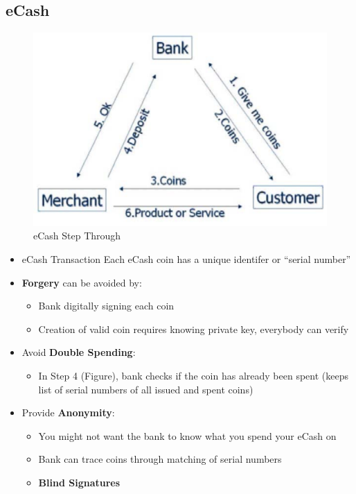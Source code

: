 \subsection{eCash}
\begin{figure}[H]
	\includegraphics[width=\linewidth]{eCash}
	\centering
	\caption{eCash Step Through}
\end{figure}
\begin{itemize}
	\item eCash Transaction
	\subitem Each eCash coin has a unique identifer or ``serial number''
	\item \textbf{Forgery} can be avoided by:
	\begin{itemize}
		\item Bank digitally signing each coin
		\item Creation of valid coin requires knowing private key, everybody can verify
	\end{itemize}
	\item Avoid \textbf{Double Spending}:
	\begin{itemize}
		\item In Step 4 (Figure), bank checks if the coin has already been spent (keeps list of serial numbers of all issued and spent coins)
	\end{itemize}
	\item Provide \textbf{Anonymity}:
	\begin{itemize}
		\item You might not want the bank to know what you spend your eCash on
		\item Bank can trace coins through matching of serial numbers
		\item \textbf{Blind Signatures}
	\end{itemize}
\end{itemize}
